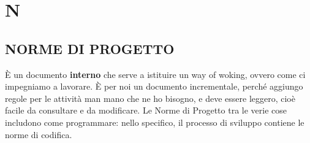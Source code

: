 \newpage
	\section{N} \label{sec:N}

		\subsection{NORME DI PROGETTO}	 \label{norme}
		È un documento \textbf{interno} che serve a istituire un way of woking, ovvero come ci impegniamo a lavorare. È per noi un documento incrementale, perché aggiungo regole per le attività man mano che ne ho bisogno, e deve essere leggero, cioè facile da consultare e da modificare.
		Le Norme di Progetto tra le verie cose includono come programmare: nello specifico, il processo di sviluppo contiene le norme di codifica.
